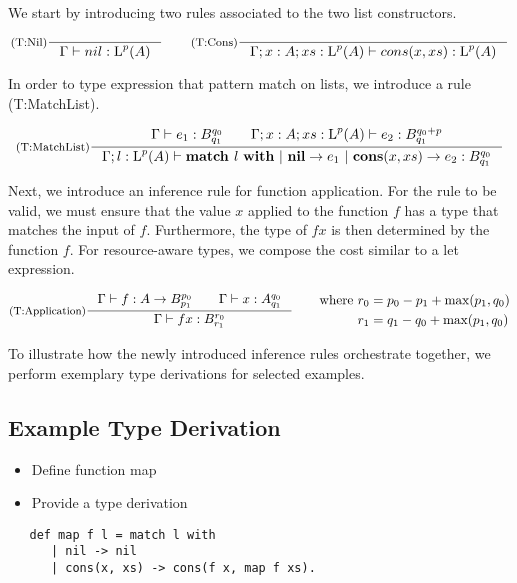 We start by introducing two rules associated to the two list constructors. 

\[
   \inference[(T:Nil)]
   {}
   {\typing{\Gamma}{nil}{\ralist{p}{A}}}
   \qquad
   \inference[(T:Cons)]
   {}
   {\typing{\Gamma;x : A; xs : \ralist{p}{A}}{cons(x, xs)}{\ralist{p}{A}}}
\]

In order to type expression that pattern match on lists, we introduce a rule (T:MatchList). 

\[
   \inference[(T:MatchList)]
   {\typing{\Gamma}{e_1}{\ratype{B}{q_0}{q_1}} \qquad \typing{\Gamma;x : A; xs : \ralist{p}{A}}{e_2}{\ratype{B}{q_0 + p}{q_1}}}
   {\typing{\Gamma;l : \ralist{p}{A}}{\listmatch{l}{e_1}{e_2}}{\ratype{B}{q_0}{q_1}}}
\]

Next, we introduce an inference rule for function application. For the rule to be valid, we must ensure that the value \(x\) applied to the function \(f\) has a type that matches the input of \(f\). Furthermore, the type of \(f x\) is then determined by the function \(f\). For resource-aware types, we compose the cost similar to a let expression. 

\[
   \inference[(T:Application)]
   {\typing{\Gamma}{f}{\rafunc{A}{B}{p_0}{p_1}} \qquad \typing{\Gamma}{x}{\ratype{A}{q_0}{q_1}}}
   {\typing{\Gamma}{f x}{\ratype{B}{r_0}{r_1}}}
   \qquad
   \begin{aligned}
      \text{where }  & r_0 = p_0 - p_1 + \max(p_1, q_0)\\
                     & r_1 = q_1 - q_0 + \max(p_1, q_0)
   \end{aligned}
\]


To illustrate how the newly introduced inference rules orchestrate together, we perform exemplary type derivations for selected examples.

\subsection{Example Type Derivation}
\begin{itemize}
   \item Define function map
   \item Provide a type derivation
\end{itemize}

\begin{verbatim}
   def map f l = match l with 
      | nil -> nil
      | cons(x, xs) -> cons(f x, map f xs).
\end{verbatim}

